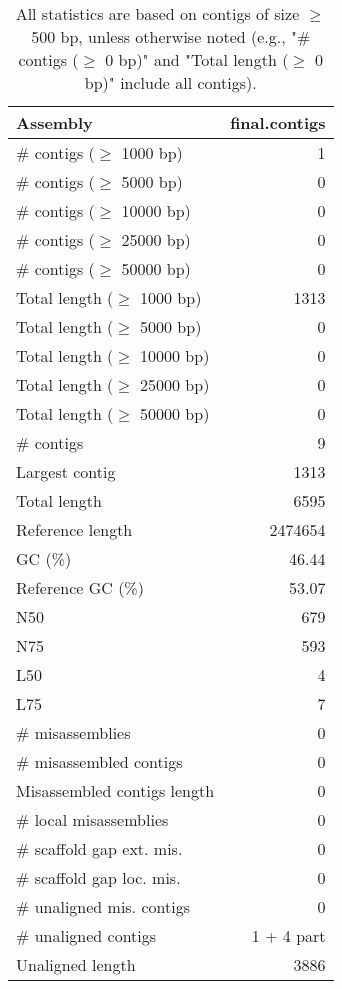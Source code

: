 \documentclass[12pt,a4paper]{article}
\begin{document}
\begin{table}[ht]
\begin{center}
\caption{All statistics are based on contigs of size $\geq$ 500 bp, unless otherwise noted (e.g., "\# contigs ($\geq$ 0 bp)" and "Total length ($\geq$ 0 bp)" include all contigs).}
\begin{tabular}{|l*{1}{|r}|}
\hline
Assembly & final.contigs \\ \hline
\# contigs ($\geq$ 1000 bp) & 1 \\ \hline
\# contigs ($\geq$ 5000 bp) & 0 \\ \hline
\# contigs ($\geq$ 10000 bp) & 0 \\ \hline
\# contigs ($\geq$ 25000 bp) & 0 \\ \hline
\# contigs ($\geq$ 50000 bp) & 0 \\ \hline
Total length ($\geq$ 1000 bp) & 1313 \\ \hline
Total length ($\geq$ 5000 bp) & 0 \\ \hline
Total length ($\geq$ 10000 bp) & 0 \\ \hline
Total length ($\geq$ 25000 bp) & 0 \\ \hline
Total length ($\geq$ 50000 bp) & 0 \\ \hline
\# contigs & 9 \\ \hline
Largest contig & 1313 \\ \hline
Total length & 6595 \\ \hline
Reference length & 2474654 \\ \hline
GC (\%) & 46.44 \\ \hline
Reference GC (\%) & 53.07 \\ \hline
N50 & 679 \\ \hline
N75 & 593 \\ \hline
L50 & 4 \\ \hline
L75 & 7 \\ \hline
\# misassemblies & 0 \\ \hline
\# misassembled contigs & 0 \\ \hline
Misassembled contigs length & 0 \\ \hline
\# local misassemblies & 0 \\ \hline
\# scaffold gap ext. mis. & 0 \\ \hline
\# scaffold gap loc. mis. & 0 \\ \hline
\# unaligned mis. contigs & 0 \\ \hline
\# unaligned contigs & 1 + 4 part \\ \hline
Unaligned length & 3886 \\ \hline

\end{tabular}
\end{center}
\end{table}
\end{document}

